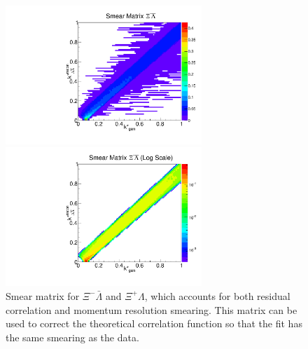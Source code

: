 \begin{figure}[ht]
\begin{minipage}{17.5pc}
\includegraphics[width=17.5pc]{Figures/SmearMatrices/2016-7-19-SmearMatrixXiCLambdaNormLA.pdf}
\end{minipage}\hspace{0.5pc}
\begin{minipage}{17.5pc}
\includegraphics[width=17.5pc]{Figures/SmearMatrices/2016-7-19-SmearMatrixXiCLambdaNormLALog.pdf}
\end{minipage} 
\caption[Smear matrix -- $\Xi^{-}\bar{\Lambda}$ and $\Xi^{+}\Lambda$]{
Smear matrix for $\Xi^{-}\bar{\Lambda}$ and $\Xi^{+}\Lambda$, which accounts for both residual correlation and momentum resolution smearing. This matrix can be used to correct the theoretical correlation function so that the fit has the same smearing as the data.
}
\end{figure}

